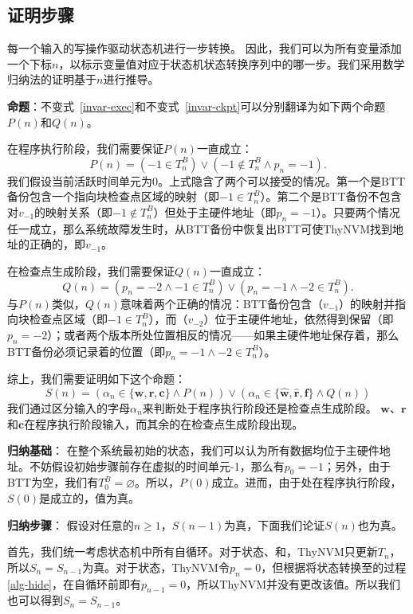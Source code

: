 \subsection{证明步骤}

每一个输入的写操作驱动状态机进行一步转换。 因此，我们可以为所有变量添加一个下标$n$，以标示变量值对应于状态机状态转换序列中的哪一步。我们采用数学归纳法的证明基于$n$进行推导。

\textbf{命题}：不变式~\ref{invar-exec}和不变式~\ref{invar-ckpt}可以分别翻译为如下两个命题$P(n)$和$Q(n)$。

在程序执行阶段，我们需要保证$P(n)$一直成立：$$ P(n)=(-1 \in T^B_n) \vee (-1 \notin T^B_n \wedge p_n=-1). $$ 我们假设当前活跃时间单元为0。上式隐含了两个可以接受的情况。第一个是BTT备份包含一个指向块检查点区域的映射（即$-1 \in T^B_n$）。第二个是BTT备份不包含对$v_{-1}$的映射关系（即$-1 \notin T^B_n$）但{\cl}处于主硬件地址（即$p_n=-1$）。只要两个情况任一成立，那么系统故障发生时，从BTT备份中恢复出BTT可使ThyNVM找到地址的正确的{\cl}，即$v_{-1}$。

在检查点生成阶段，我们需要保证$Q(n)$一直成立：$$ Q(n)=(p_n=-2 \wedge -1 \in T^B_n) \vee (p_n=-1 \wedge -2 \in T^B_n). $$ 与$P(n)$类似，$Q(n)$意味着两个正确的情况：BTT备份包含{\cl}（$v_{-1}$）的映射并指向块检查点区域（即$-1 \in T^B_n$），而\cp（$v_{-2}$）位于主硬件地址，依然得到保留（即$p_n=-2$）；或者两个版本所处位置相反的情况——如果主硬件地址保存着{\cl}，那么BTT备份必须记录着{\cp}的位置（即$p_n=-1 \wedge -2 \in T^B_n$）。

综上，我们需要证明如下这个命题：$$S(n)=(\alpha_n \in
\{\mathbf{w}, \mathbf{r}, \mathbf{c}\} \wedge P(n)) \vee (\alpha_n \in
\{\mathbf{\hat{w}}, \mathbf{\hat{r}}, \mathbf{f}\} \wedge Q(n))$$
我们通过区分输入的字母$\alpha_n$来判断处于程序执行阶段还是检查点生成阶段。 $\mathbf{w}、\mathbf{r}$和$\mathbf{c}$在程序执行阶段输入，而其余的在检查点生成阶段出现。

\textbf{归纳基础}：
在整个系统最初始的状态，我们可以认为所有数据均位于主硬件地址。不妨假设初始步骤前存在虚拟的时间单元-1，那么有$p_0=-1$；另外，由于BTT为空，我们有$T^B_0=\varnothing$。所以，$P(0)$成立。进而，由于处在程序执行阶段，$S(0)$是成立的，值为真。

\noindent\textbf{归纳步骤}：
假设对任意的$n \ge 1$，$S(n-1)$为真，下面我们论证$S(n)$也为真。

首先，我们统一考虑状态机中所有自循环。对于状态、和，ThyNVM只更新$T_n$，所以$S_n=S_{n-1}$为真。对于状态，ThyNVM令$p_n=0$，但根据将状态转换至的过程\ref{alg-hide}，在自循环前即有$p_{n-1}=0$，所以ThyNVM并没有更改该值。所以我们也可以得到$S_n=S_{n-1}$。

